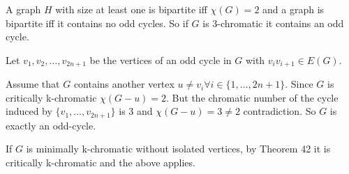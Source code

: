 A graph $H$ with size at least one is bipartite iff $\chi(G) = 2$ 
and a graph is bipartite iff it contains no odd cycles. 
So if $G$ is 3-chromatic it contains an odd cycle.

Let $v_1, v_2, \ldots, v_{2n+1}$ be the vertices of an odd
cycle in $G$ with $v_iv_{i+1} \in E(G)$. 

Assume that $G$
contains another vertex $u \ne v_i \forall i \in \{1, \ldots, 2n+1\}$.
Since $G$ is
critically k-chromatic $\chi(G-u) = 2$. But the chromatic number of the
cycle induced by $\{ v_1, \ldots, v_{2n+1} \}$ is 3
and $\chi(G-u) = 3 \ne 2$ contradiction. So $G$ is exactly an odd-cycle.

If $G$ is minimally k-chromatic without isolated vertices, by Theorem
42 it is critically k-chromatic and the above applies.
